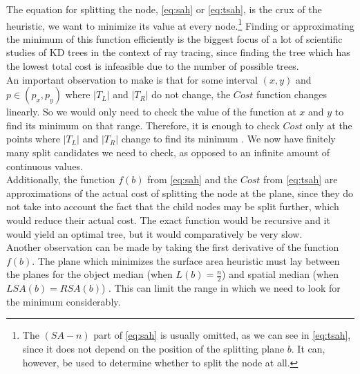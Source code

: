 \documentclass[12pt]{article}
\begin{document}
\noindent The equation for splitting the node, \eqref{eq:sah} or \eqref{eq:tsah}, is the crux of the heuristic, we want to minimize its value at every node.\footnote{The $(SA - n)$ part of \eqref{eq:sah} is usually omitted, as we can see in \eqref{eq:tsah}, since it does not depend on the position of the splitting plane $b$. It can, however, be used to determine whether to split the node at all.} Finding or approximating the minimum of this function efficiently is the biggest focus of a lot of scientific studies of KD trees in the context of ray tracing, since finding the tree which has the lowest total cost is infeasible due to the number of possible trees.\\
\indent An important observation to make is that for some interval $\left(x, y\right)$ and $p \in \left(p_x, p_y\right)$ where $|T_L|$ and $|T_R|$ do not change, the $Cost$ function changes linearly. So we would only need to check the value of the function at $x$ and $y$ to find its minimum on that range. Therefore, it is enough to check $Cost$ only at the points where $|T_L|$ and $|T_R|$ change to find its minimum \cite{wald2006building}. We now have finitely many split candidates we need to check, as opposed to an infinite amount of continuous values.\\
\indent Additionally, the function $f(b)$ from \eqref{eq:sah} and the $Cost$ from \eqref{eq:tsah} are approximations of the actual cost of splitting the node at the plane, since they do not take into account the fact that the child nodes may be split further, which would reduce their actual cost. The exact function would be recursive and it would yield an optimal tree, but it would comparatively be very slow.\\
\indent Another observation can be made by taking the first derivative of the function $f(b)$. The plane which minimizes the surface area heuristic must lay between the planes for the object median (when $L(b) = \frac{n}{2}$) and spatial median (when $LSA(b) = RSA(b)$) \cite{macdonald1990heuristics}. This can limit the range in which we need to look for the minimum considerably.
\end{document}
